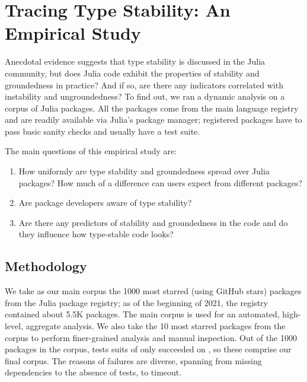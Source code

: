 \chapter{Tracing Type Stability: An Empirical Study}\label{sec:empirical}

Anecdotal evidence suggests that type stability is discussed in the
Julia community, but does Julia code exhibit the properties of stability
and groundedness in practice? And if so, are there any indicators correlated with
instability and ungroundedness? To find out, we ran a dynamic analysis on a
corpus of Julia packages. All the packages come from the main language registry
and are readily available via Julia's package manager; registered packages have
to pass basic sanity checks and usually have a test suite.

The main questions of this empirical study are:
\begin{enumerate}
\item How uniformly are type stability and groundedness spread over Julia packages?
  How much of a difference can users expect from different packages?
\item Are package developers aware of type stability?
\item Are there any predictors of stability and groundedness in the code and do
  they influence how type-stable code looks?
\end{enumerate}

\section{Methodology}

We take as our main corpus the 1000 most starred (using GitHub stars) packages
from the Julia package registry; as of the beginning of 2021, the registry
contained about 5.5K packages. The main corpus is used for an automated,
high-level, aggregate analysis. We also take the 10 most starred packages from
the corpus to perform finer-grained analysis and manual inspection. Out of the
1000 packages in the corpus, tests suits of only \goodpkgsnum succeeded on
\juliaversion, so these \goodpkgsnum comprise our final corpus. The reasons of
failures are diverse, spanning from missing dependencies to the absence of
tests, to timeout.

